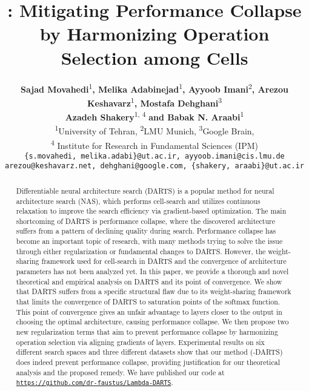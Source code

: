 \documentclass{article} \usepackage{fancyhdr, iclr2023_conference, times}
\title{\mydarts: Mitigating Performance Collapse by Harmonizing Operation Selection among Cells}
\author{\normalfont \hspace{-5pt}\begin{tabular}{@{}lll@{}}
\\
\textbf{Sajad Movahedi}\textsuperscript{1}\textbf{, Melika Adabinejad}\textsuperscript{1}\textbf{, Ayyoob Imani}\textsuperscript{2}\textbf{, Arezou Keshavarz}\textsuperscript{1}\textbf{, Mostafa Dehghani}\textsuperscript{3}\\
\textbf{Azadeh Shakery}\textsuperscript{1, 4}\textbf{ and Babak N. Araabi}\textsuperscript{1}\\
\textsuperscript{1}University of Tehran, \textsuperscript{2}LMU Munich, \textsuperscript{3}Google Brain, \\\textsuperscript{4} Institute for Research in Fundamental Sciences (IPM)
\\
\texttt{\{s.movahedi, melika.adabi\}@ut.ac.ir, ayyoob.imani@cis.lmu.de}\\
\texttt{arezou@keshavarz.net,
dehghani@google.com,
\{shakery, araabi\}@ut.ac.ir}
\end{tabular}
}
\newcommand{\mydarts}{-DARTS\xspace}
\begin{document}
\setlength{}
\setlength\emergencystretch{1pt}

\maketitle

\begin{abstract}
Differentiable neural architecture search (DARTS) is a popular method for neural architecture search (NAS), which performs cell-search and utilizes continuous relaxation to improve the search efficiency via gradient-based optimization. The main shortcoming of DARTS is performance collapse, where the discovered architecture suffers from a pattern of declining quality during search. Performance collapse has become an important topic of research, with many methods trying to solve the issue through either regularization or fundamental changes to DARTS.
However, the weight-sharing framework used for cell-search in DARTS and the convergence of architecture parameters has not been analyzed yet. In this paper, we provide a thorough and novel theoretical and empirical analysis on DARTS and its point of convergence.
We show that DARTS suffers from a specific structural flaw due to its weight-sharing framework that limits the convergence of DARTS to saturation points of the softmax function. This point of convergence gives an unfair advantage to layers closer to the output in choosing the optimal architecture, causing performance collapse. We then propose two new regularization terms that aim to prevent performance collapse by harmonizing operation selection via aligning gradients of layers. 
Experimental results on six different search spaces and three different datasets show that our method (\mydarts) does indeed prevent performance collapse, providing justification for our theoretical analysis and the proposed remedy. We have published our code at \href{https://github.com/dr-faustus/Lambda-DARTS}{\texttt{https://github.com/dr-faustus/Lambda-DARTS}}.
\end{abstract}
\end{document}
